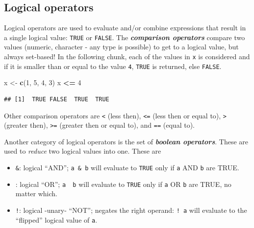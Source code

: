 \documentclass[]{book}
\newenvironment{Shaded}{\begin{snugshade}}{\end{snugshade}}
\newcommand{\DecValTok}[1]{\textcolor[rgb]{0.00,0.00,0.81}{#1}}
\newcommand{\KeywordTok}[1]{\textcolor[rgb]{0.13,0.29,0.53}{\textbf{#1}}}
\newcommand{\NormalTok}[1]{#1}
\newcommand{\OperatorTok}[1]{\textcolor[rgb]{0.81,0.36,0.00}{\textbf{#1}}}
\newcommand{\StringTok}[1]{\textcolor[rgb]{0.31,0.60,0.02}{#1}}
\providecommand{\tightlist}{%
  \setlength{\itemsep}{0pt}\setlength{\parskip}{0pt}}
\begin{document}
\hypertarget{logical-operators}{%
\subsection{Logical operators}\label{logical-operators}}

Logical operators are used to evaluate and/or combine expressions that result in a single logical value: \texttt{TRUE} or \texttt{FALSE}. The \textbf{\emph{comparison operators}} compare two values (numeric, character - any type is possible) to get to a logical value, but always set-based! In the following chunk, each of the values in \texttt{x} is considered and if it is smaller than or equal to the value \texttt{4}, \texttt{TRUE} is returned, else \texttt{FALSE}.

\begin{Shaded}
\begin{Highlighting}[]
\NormalTok{x <-}\StringTok{ }\KeywordTok{c}\NormalTok{(}\DecValTok{1}\NormalTok{, }\DecValTok{5}\NormalTok{, }\DecValTok{4}\NormalTok{, }\DecValTok{3}\NormalTok{)}
\NormalTok{x }\OperatorTok{<=}\StringTok{ }\DecValTok{4}
\end{Highlighting}
\end{Shaded}

\begin{verbatim}
## [1]  TRUE FALSE  TRUE  TRUE
\end{verbatim}

Other comparison operators are \texttt{\textless{}} (less then), \texttt{\textless{}=} (less then or equal to), \texttt{\textgreater{}} (greater then), \texttt{\textgreater{}=} (greater then or equal to), and \texttt{==} (equal to).

Another category of logical operators is the set of \textbf{\emph{boolean operators}}. These are used to \emph{reduce} two logical values into one. These are

\begin{itemize}
\tightlist
\item
  \texttt{\&}: logical ``AND''; \texttt{a\ \&\ b} will evaluate to \texttt{TRUE} only if \texttt{a} AND \texttt{b} are TRUE.\\
\item
  \texttt{\textbar{}}: logical ``OR''; \texttt{a\ \textbar{}\ b} will evaluate to \texttt{TRUE} only if \texttt{a} OR \texttt{b} are TRUE, no matter which.
\item
  \texttt{!}: logical -unary- ``NOT''; negates the right operand: \texttt{!\ a} will evaluate to the ``flipped'' logical value of \texttt{a}.
\end{itemize}
\end{document}
